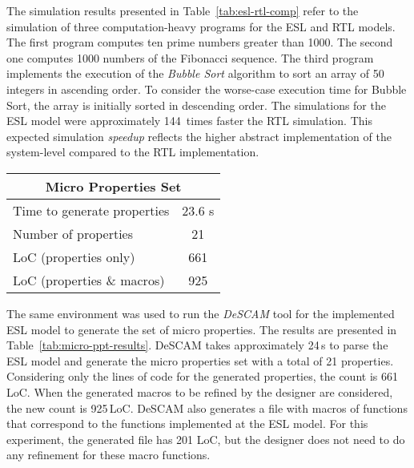 The simulation results presented in Table~\ref{tab:esl-rtl-comp} refer to the simulation of three computation-heavy programs for the ESL and RTL models. The first program computes ten prime numbers greater than 1000. The second one computes 1000 numbers of the Fibonacci sequence. The third program implements the execution of the \textit{Bubble Sort} algorithm to sort an array of 50 integers in ascending order. To consider the worse-case execution time for Bubble Sort, the array is initially sorted in descending order. The simulations for the ESL model were approximately 144~times faster the RTL simulation. This expected simulation \textit{speedup} reflects the higher abstract implementation of the system-level compared to the RTL implementation.

\begin{table*}[htb!] 
	\centering 
	\caption{Results for micro properties generated by DeSCAM from the RI5CY ESL model.} 
	\label{tab:micro-ppt-results}
	\begin{tabular}{p{6cm} c } 
		\multicolumn{2}{c}{\textbf{Micro Properties Set}} \\  
		\hline	
		Time to generate properties  &  23.6 s  \\
		Number of properties  &  21 \\
		LoC (properties only)  &  661 \\
		LoC (properties \& macros)  &  925\\
	\end{tabular} 
\end{table*}

The same environment was used to run the \textit{DeSCAM} tool for the implemented ESL model to generate the set of micro properties. The results are presented in Table~\ref{tab:micro-ppt-results}. DeSCAM takes approximately 24\,s to parse the ESL model and generate the micro properties set with a total of 21 properties. Considering only the lines of code for the generated properties, the count is 661\,LoC. When the generated macros to be refined by the designer are considered, the new count is 925\,LoC. DeSCAM also generates a file with macros of functions that correspond to the functions implemented at the ESL model. For this experiment, the generated file has 201 LoC, but the designer does not need to do any refinement for these macro functions.  


